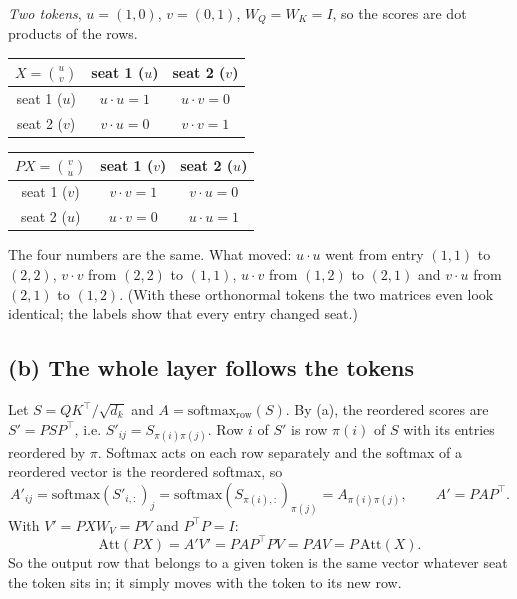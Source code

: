 \emph{Two tokens}, $u=(1,0)$, $v=(0,1)$, $W_Q=W_K=I$, so the scores are dot products of the rows.
\begin{center}
\begin{tabular}{c|cc}
$X=\binom{u}{v}$ & seat 1 ($u$) & seat 2 ($v$)\\\hline
seat 1 ($u$) & $u\!\cdot\!u=1$ & $u\!\cdot\!v=0$\\
seat 2 ($v$) & $v\!\cdot\!u=0$ & $v\!\cdot\!v=1$
\end{tabular}
\qquad
\begin{tabular}{c|cc}
$PX=\binom{v}{u}$ & seat 1 ($v$) & seat 2 ($u$)\\\hline
seat 1 ($v$) & $v\!\cdot\!v=1$ & $v\!\cdot\!u=0$\\
seat 2 ($u$) & $u\!\cdot\!v=0$ & $u\!\cdot\!u=1$
\end{tabular}
\end{center}
The four numbers are the same. What moved: $u\!\cdot\!u$ went from entry $(1,1)$ to $(2,2)$, $v\!\cdot\!v$ from $(2,2)$ to $(1,1)$,
$u\!\cdot\!v$ from $(1,2)$ to $(2,1)$ and $v\!\cdot\!u$ from $(2,1)$ to $(1,2)$. (With these orthonormal tokens the two matrices
even look identical; the labels show that every entry changed seat.)

\subsection*{(b) The whole layer follows the tokens}
Let $S=QK^\top/\sqrt{d_k}$ and $A=\mathrm{softmax}_\text{row}(S)$. By (a), the reordered scores are $S'=PSP^\top$, i.e.
$S'_{ij}=S_{\pi(i)\pi(j)}$. Row $i$ of $S'$ is row $\pi(i)$ of $S$ with its entries reordered by $\pi$. Softmax acts on each
row separately and the softmax of a reordered vector is the reordered softmax, so
\[
A'_{ij}=\mathrm{softmax}(S'_{i,:})_j=\mathrm{softmax}(S_{\pi(i),:})_{\pi(j)}=A_{\pi(i)\pi(j)},\qquad A'=PAP^\top .
\]
With $V'=PXW_V=PV$ and $P^\top P=I$:
\[
\mathrm{Att}(PX)=A'V'=PAP^\top PV=PAV=P\,\mathrm{Att}(X).
\]
So the output row that belongs to a given token is the same vector whatever seat the token sits in; it simply moves with
the token to its new row.

